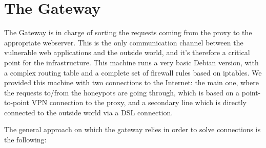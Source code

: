 \section {The Gateway}

The Gateway is in charge of sorting the requests coming from the proxy to the appropriate webserver. This is the only communication channel between the vulnerable web applications and the outside world, and it's therefore a critical point for the infrastructure.
This machine runs a very basic Debian version, with a complex routing table and a complete set of firewall rules based on iptables. We provided this machine with two connections to the Internet: the main one, where the requests to/from the honeypots are going through, which is based on a point-to-point VPN connection to the proxy, and a secondary line which is directly connected to the outside world via a DSL connection.

The general approach on which the gateway relies in order to solve connections is the following:

